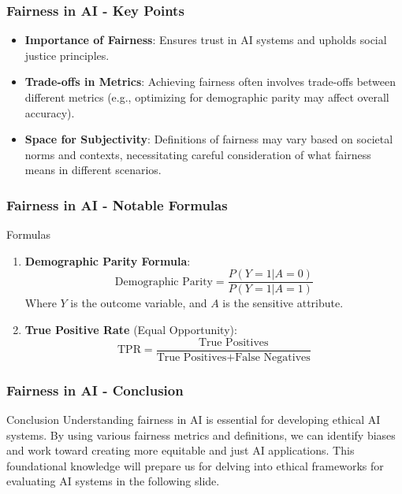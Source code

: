 \documentclass{beamer}
\begin{document}
\begin{frame}[fragile]
    \frametitle{Fairness in AI - Key Points}
    \begin{itemize}
        \item \textbf{Importance of Fairness}: Ensures trust in AI systems and upholds social justice principles.
        \item \textbf{Trade-offs in Metrics}: Achieving fairness often involves trade-offs between different metrics (e.g., optimizing for demographic parity may affect overall accuracy).
        \item \textbf{Space for Subjectivity}: Definitions of fairness may vary based on societal norms and contexts, necessitating careful consideration of what fairness means in different scenarios.
    \end{itemize}
\end{frame}

\begin{frame}[fragile]
    \frametitle{Fairness in AI - Notable Formulas}
    \begin{block}{Formulas}
        \begin{enumerate}
            \item \textbf{Demographic Parity Formula}:
            \begin{equation}
                \text{Demographic Parity} = \frac{P(Y=1|A=0)}{P(Y=1|A=1)}
            \end{equation}
            Where \( Y \) is the outcome variable, and \( A \) is the sensitive attribute.

            \item \textbf{True Positive Rate} (Equal Opportunity):
            \begin{equation}
                \text{TPR} = \frac{\text{True Positives}}{\text{True Positives} + \text{False Negatives}}
            \end{equation}
        \end{enumerate}
    \end{block}
\end{frame}

\begin{frame}[fragile]
    \frametitle{Fairness in AI - Conclusion}
    \begin{block}{Conclusion}
        Understanding fairness in AI is essential for developing ethical AI systems. By using various fairness metrics and definitions, we can identify biases and work toward creating more equitable and just AI applications. This foundational knowledge will prepare us for delving into ethical frameworks for evaluating AI systems in the following slide.
    \end{block}
\end{frame}
\end{document}
